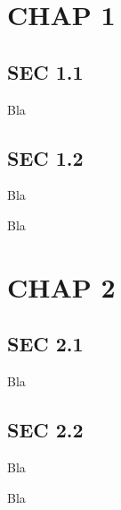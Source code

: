 \documentclass{book}
\begin{document}
\chapter{CHAP 1}

\section{SEC 1.1}

\def\bibsection{\subsection*{Section Bibliography}}
\begin{thebibliography}{12}
 Bla
\end{thebibliography}

\section{SEC 1.2}

\def\bibsection{\subsection*{Section Bibliography}}
\begin{thebibliography}{12}
 Bla
\end{thebibliography}

\def\bibsection{\section*{Chapter Bibliography}}
\begin{thebibliography}{12}
 Bla
\end{thebibliography}

\chapter{CHAP 2}

\section{SEC 2.1}

\def\bibsection{\subsection{Section Bibliography}}
\begin{thebibliography}{12}
 Bla
\end{thebibliography}

\section{SEC 2.2}

\def\bibsection{\subsection{Section Bibliography}}
\begin{thebibliography}{12}
 Bla
\end{thebibliography}

\def\bibsection{\section{Chapter Bibliography}}
\begin{thebibliography}{12}
 Bla
\end{thebibliography}
\end{document}
